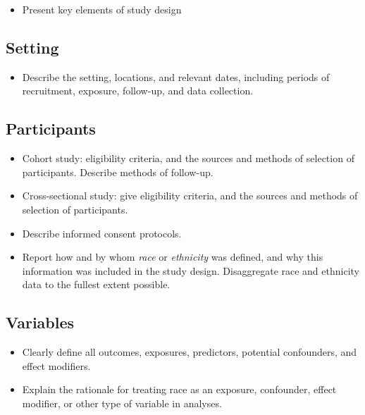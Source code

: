 \documentclass[
  letterpaper,
  DIV=11,
  numbers=noendperiod]{scrartcl}
\providecommand{\tightlist}{%
  \setlength{\itemsep}{0pt}\setlength{\parskip}{0pt}}\usepackage{longtable,booktabs,array}
\begin{document}
\begin{itemize}
\tightlist
\item
  Present key elements of study design
\end{itemize}

\subsection{Setting}\label{sec-setting}

\begin{itemize}
\tightlist
\item
  Describe the setting, locations, and relevant dates, including periods
  of recruitment, exposure, follow-up, and data collection.
\end{itemize}

\subsection{Participants}\label{sec-participants}

\begin{itemize}
\tightlist
\item
  Cohort study: eligibility criteria, and the sources and methods of
  selection of participants. Describe methods of follow-up.
\item
  Cross-sectional study: give eligibility criteria, and the sources and
  methods of selection of participants.
\item
  Describe informed consent protocols.
\item
  Report how and by whom \emph{race} or \emph{ethnicity} was defined,
  and why this information was included in the study design.
  Disaggregate race and ethnicity data to the fullest extent possible.
\end{itemize}

\subsection{Variables}\label{sec-vars}

\begin{itemize}
\tightlist
\item
  Clearly define all outcomes, exposures, predictors, potential
  confounders, and effect modifiers.
\item
  Explain the rationale for treating race as an exposure, confounder,
  effect modifier, or other type of variable in analyses.
\end{itemize}
\end{document}
